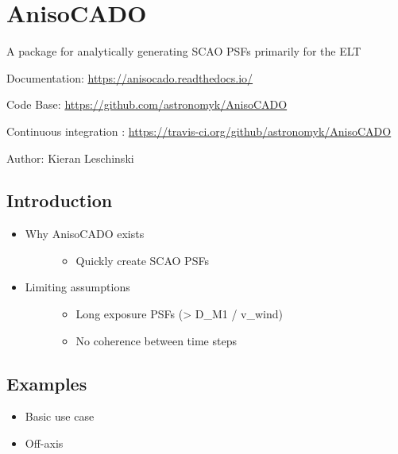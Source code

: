 

\section{AnisoCADO%
  \label{anisocado}%
}

A package for analytically generating SCAO PSFs primarily for the ELT

Documentation: \url{https://anisocado.readthedocs.io/}

Code Base: \url{https://github.com/astronomyk/AnisoCADO}

Continuous integration : \url{https://travis-ci.org/github/astronomyk/AnisoCADO}

Author: Kieran Leschinski


\subsection{Introduction%
  \label{introduction}%
}

\begin{itemize}
\item 
\begin{description}
\item[{Why AnisoCADO exists}] \leavevmode 
\begin{itemize}
\item Quickly create SCAO PSFs
\end{itemize}

\end{description}

\item 
\begin{description}
\item[{Limiting assumptions}] \leavevmode 
\begin{itemize}
\item Long exposure PSFs (> D\_M1 / v\_wind)

\item No coherence between time steps
\end{itemize}

\end{description}
\end{itemize}


\subsection{Examples%
  \label{examples}%
}

\begin{itemize}
\item Basic use case

\item Off-axis
\end{itemize}

